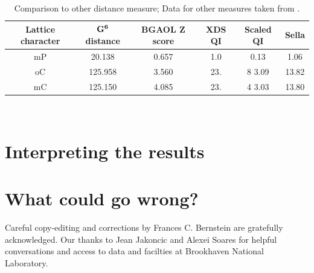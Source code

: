 \documentclass[preprint]{iucr}              %
\newcommand{\GVI}[0]{$\bf{G^{6}}$}
\begin{document}
	
\begin{table}
	\begin{tabular}{cccccc}
		\toprule
		Lattice character & \GVI{} distance & BGAOL Z score & XDS QI & Scaled QI & Sella \\
		\midrule
		mP               &     20.138  & 0.657    &   1.0  & 0.13  & 1.06\\	
		oC               &     125.958 &  3.560   &    23. & 8 3.09& 13.82\\	
		mC               &     125.150 &  4.085   &    23. & 4 3.03& 13.80\\	
		\bottomrule
	\end{tabular}
	\caption{Comparison to other distance measure; Data for other measures taken from .}
	\label{tab:comparisons}
\end{table}
	~\\
	
	\section{Interpreting the results}
	
	
	\section{What could go wrong?}
	
	
	
	
	
	
	
	
	Careful copy-editing and corrections by Frances C. Bernstein are 
	gratefully acknowledged.  	Our thanks to Jean Jakoncic and Alexei Soares for 
	helpful conversations and access to data and facilties at 
	Brookhaven National Laboratory.
	
	
\end{document}
